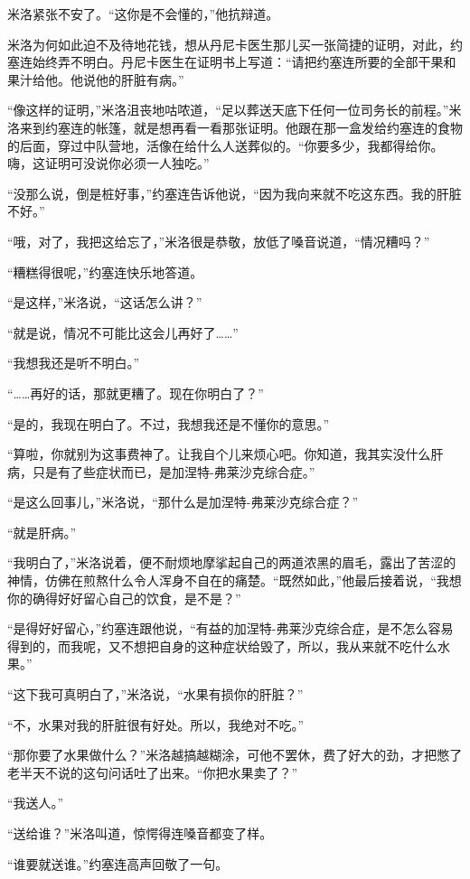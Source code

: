     米洛紧张不安了。“这你是不会懂的，”他抗辩道。

    米洛为何如此迫不及待地花钱，想从丹尼卡医生那儿买一张简捷的证明，对此，约塞连始终弄不明白。丹尼卡医生在证明书上写道：“请把约塞连所要的全部干果和果汁给他。他说他的肝脏有病。”

    “像这样的证明，”米洛沮丧地咕哝道，“足以葬送天底下任何一位司务长的前程。”米洛来到约塞连的帐篷，就是想再看一看那张证明。他跟在那一盒发给约塞连的食物的后面，穿过中队营地，活像在给什么人送葬似的。“你要多少，我都得给你。嗨，这证明可没说你必须一人独吃。”

    “没那么说，倒是桩好事，”约塞连告诉他说，“因为我向来就不吃这东西。我的肝脏不好。”

    “哦，对了，我把这给忘了，”米洛很是恭敬，放低了嗓音说道，“情况糟吗？”

    “糟糕得很呢，”约塞连快乐地答道。

    “是这样，”米洛说，“这话怎么讲？”

    “就是说，情况不可能比这会儿再好了……”

    “我想我还是听不明白。”

    “……再好的话，那就更糟了。现在你明白了？”

    “是的，我现在明白了。不过，我想我还是不懂你的意思。”

    “算啦，你就别为这事费神了。让我自个儿来烦心吧。你知道，我其实没什么肝病，只是有了些症状而已，是加涅特-弗莱沙克综合症。”

    “是这么回事儿，”米洛说，“那什么是加涅特-弗莱沙克综合症？”

    “就是肝病。”

    “我明白了，”米洛说着，便不耐烦地摩挲起自己的两道浓黑的眉毛，露出了苦涩的神情，仿佛在煎熬什么令人浑身不自在的痛楚。“既然如此，”他最后接着说，“我想你的确得好好留心自己的饮食，是不是？”

    “是得好好留心，”约塞连跟他说，“有益的加涅特-弗莱沙克综合症，是不怎么容易得到的，而我呢，又不想把自身的这种症状给毁了，所以，我从来就不吃什么水果。”

    “这下我可真明白了，”米洛说，“水果有损你的肝脏？”

    “不，水果对我的肝脏很有好处。所以，我绝对不吃。”

    “那你要了水果做什么？”米洛越搞越糊涂，可他不罢休，费了好大的劲，才把憋了老半天不说的这句问话吐了出来。“你把水果卖了？”

    “我送人。”

    “送给谁？”米洛叫道，惊愕得连嗓音都变了样。

    “谁要就送谁。”约塞连高声回敬了一句。

